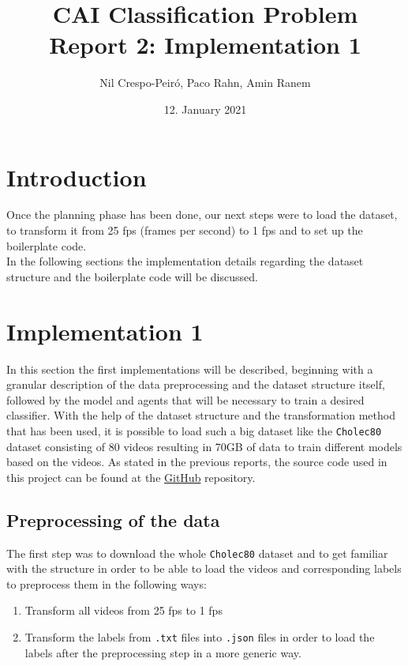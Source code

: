 \documentclass{article}
\title{CAI Classification Problem\\Report 2: Implementation 1}
\author{Nil Crespo-Peiró, Paco Rahn, Amin Ranem}
\date{12. January 2021}
\begin{document}
\maketitle

\section{Introduction}
Once the planning phase has been done, our next steps were to load the dataset, to transform it from 25 fps (frames per second) to 1 fps and to set up the boilerplate code.\\
\noindent
In the following sections the implementation details regarding the dataset structure and the boilerplate code will be discussed.\\

\section{Implementation 1}
In this section the first implementations will be described, beginning with a granular description of the data preprocessing and the dataset structure itself, followed by the model and agents that will be necessary to train a desired classifier. With the help of the dataset structure and the transformation method that has been used, it is possible to load such a big dataset like the \texttt{Cholec80} dataset consisting of 80 videos resulting in 70GB of data to train different models based on the videos. As stated in the previous reports, the source code used in this project can be found at the \href{https://github.com/amrane99/CAI-Classification/tree/main}{GitHub} repository.

\subsection{Preprocessing of the data}
The first step was to download the whole \texttt{Cholec80} dataset and to get familiar with the structure in order to be able to load the videos and corresponding labels to preprocess them in the following ways:
\begin{enumerate}
    \item Transform all videos from 25 fps to 1 fps
    \item Transform the labels from \texttt{.txt} files into \texttt{.json} files in order to load the labels after the preprocessing step in a more generic way. 
\end{enumerate}
\end{document}
